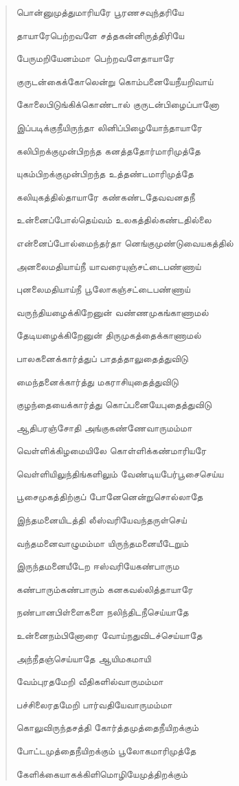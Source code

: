 \documentclass{article}
\begin{document}
\begin{quotation}
{பொன்னுமுத்துமாரியரே பூரணசவுந்தரியே

தாயாரேபெற்றவளே சத்தகன்னிருத்திரியே

பேருமறியேனம்மா பெற்றவளேதாயாரே

குருடன்கைக்கோலென்று கொம்பனையேநீயறிவாய்

கோலைபிடுங்கிக்கொண்டால் குருடன்பிழைப்பானோ

இப்படிக்குநீயிருந்தா லினிப்பிழையோந்தாயாரே

கலிபிறக்குமுன்பிறந்த கனத்ததோர்மாரிமுத்தே

யுகம்பிறக்குமுன்பிறந்த உத்தண்டமாரிமுத்தே

கலியுகத்தில்தாயாரே கண்கண்டதேவவனதநீ

உன்னைப்போல்தெய்வம் உலகத்தில்கண்டதில்லை

என்னைப்போல்மைந்தர்தா னெங்குமுண்டுவையகத்தில்

அனலைமதியாய்நீ யாவரையுஞ்சட்டைபண்ணாய்

புனலைமதியாய்நீ பூலோகஞ்சட்டைபண்ணாய்

வருந்தியழைக்கிறேனுன் வண்ணமுகங்காணாமல்

தேடியழைக்கிறேனுன்‌ திருமுகத்தைக்காணாமல்‌

பாலகனைக்கார்த்துப் பாதத்தாலுதைத்துவிடு

மைந்தனைக்கார்த்து மகராசியுதைத்துவிடு

குழந்தையைக்கார்த்து கொப்பனையேபுதைத்துவிடு

ஆதிபரஞ்சோதி அங்குகண்ணேவாருமம்மா

வெள்ளிக்கிழமையிலே கொள்ளிக்கண்மாரியரே

வெள்ளியிலுந்திங்களிலும் வேண்டியபேர்பூசைசெய்ய

பூசைமுகத்திற்குப் போனேனென்றுசொல்லாதே

இந்தமனையிடத்தி லீஸ்வரியேவந்தருள்செய்

வந்தமனைவாழுமம்மா யிருந்தமனையீடேறும்

இருந்தமனையீடேற ஈஸ்வரியேகண்பாரும

கண்பாரும்கண்பாரும் கனகவல்லித்தாயாரே

நண்பானபிள்ளைகளை நலிந்திடநீசெய்யாதே

உன்னைநம்பினோரை வோய்நதுவிடச்செய்யாதே

அந்நீதஞ்செய்யாதே ஆயிமகமாயி

வேம்புரதமேறி வீதிகளில்வாருமம்மா

பச்சிலைரதமேறி பார்வதியேவாருமம்மா

கொலுவிருந்தசத்தி கோர்த்தமுத்தைநீயிறக்கும்

போட்டமுத்தைநீயிறக்கும் பூலோகமாரிமுத்தே

கேளிக்கையாகக்கிளிமொழியேமுத்திறக்கும்

}
\end{quotation}
\end{document}
